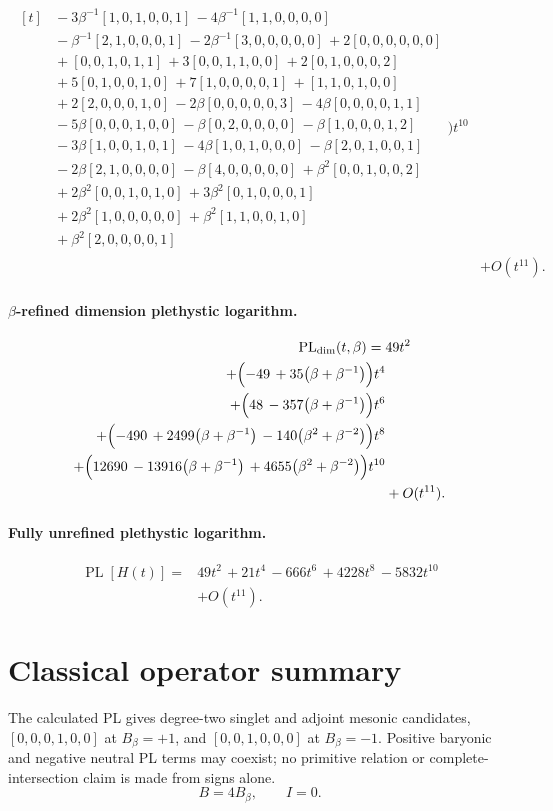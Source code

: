 \documentclass[10pt]{article}
\begin{document}
\[\begin{aligned}
\begin{aligned}[t]
  &{}-3\beta^{-1}[1,0,1,0,0,1]\,-4\beta^{-1}[1,1,0,0,0,0] \\
  &{}-\beta^{-1}[2,1,0,0,0,1]\,-2\beta^{-1}[3,0,0,0,0,0]\,+2[0,0,0,0,0,0] \\
  &{}+[0,0,1,0,1,1]\,+3[0,0,1,1,0,0]\,+2[0,1,0,0,0,2] \\
  &{}+5[0,1,0,0,1,0]\,+7[1,0,0,0,0,1]\,+[1,1,0,1,0,0] \\
  &{}+2[2,0,0,0,1,0]\,-2\beta[0,0,0,0,0,3]\,-4\beta[0,0,0,0,1,1] \\
  &{}-5\beta[0,0,0,1,0,0]\,-\beta[0,2,0,0,0,0]\,-\beta[1,0,0,0,1,2] \\
  &{}-3\beta[1,0,0,1,0,1]\,-4\beta[1,0,1,0,0,0]\,-\beta[2,0,1,0,0,1] \\
  &{}-2\beta[2,1,0,0,0,0]\,-\beta[4,0,0,0,0,0]\,+\beta^{2}[0,0,1,0,0,2] \\
  &{}+2\beta^{2}[0,0,1,0,1,0]\,+3\beta^{2}[0,1,0,0,0,1] \\
  &{}+2\beta^{2}[1,0,0,0,0,0]\,+\beta^{2}[1,1,0,0,1,0] \\
  &{}+\beta^{2}[2,0,0,0,0,1]\end{aligned}\Bigr)t^{10} \\
  &+ O(t^{11}).
\end{aligned}
\]
\paragraph{$\beta$-refined dimension plethystic logarithm.}
\[
\begin{aligned}
\operatorname{PL}_{\mathrm{dim}}(t,\beta) ={}&
   49t^{2} \\
  + \Bigl(-49\,+35\bigl(\beta+\beta^{-1}\bigr)\Bigr)t^{4} \\
  + \Bigl(48\,-357\bigl(\beta+\beta^{-1}\bigr)\Bigr)t^{6} \\
  + \Bigl(-490\,+2499\bigl(\beta+\beta^{-1}\bigr)\,-140\bigl(\beta^{2}+\beta^{-2}\bigr)\Bigr)t^{8} \\
  + \Bigl(12690\,-13916\bigl(\beta+\beta^{-1}\bigr)\,+4655\bigl(\beta^{2}+\beta^{-2}\bigr)\Bigr)t^{10} \\
  &+ O(t^{11}).
\end{aligned}
\]
\paragraph{Fully unrefined plethystic logarithm.}
\[
\begin{aligned}
\operatorname{PL}[H(t)] ={}& 49t^{2}\,+21t^{4}\,-666t^{6}\,+4228t^{8}\,-5832t^{10} \\
  &+ O(t^{11}).
\end{aligned}
\]
\section{Classical operator summary}
The calculated PL gives degree-two singlet and adjoint mesonic candidates,
$[0,0,0,1,0,0]$ at $B_\beta=+1$, and $[0,0,1,0,0,0]$ at $B_\beta=-1$.
Positive baryonic and negative neutral PL terms may coexist; no primitive
relation or complete-intersection claim is made from signs alone.
\[B=4B_\beta,\qquad I=0.\]
\end{document}
